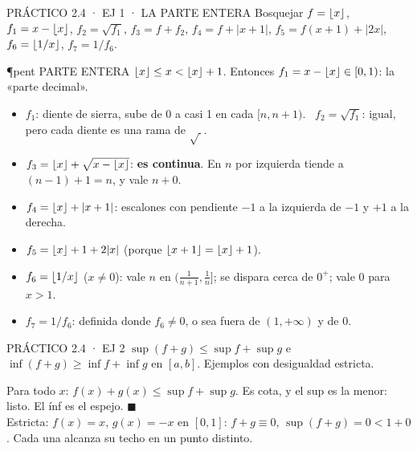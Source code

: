 \begin{enunciado}{PRÁCTICO 2.4 · EJ 1 · LA PARTE ENTERA}
Bosquejar $f=\lfloor x\rfloor$, $f_1=x-\lfloor x\rfloor$, $f_2=\sqrt{f_1}$, $f_3=f+f_2$, $f_4=f+|x+1|$, $f_5=f(x+1)+|2x|$, $f_6=\lfloor 1/x\rfloor$, $f_7=1/f_6$.
\end{enunciado}
\begin{uso}{\P{pent} PARTE ENTERA}
$\lfloor x\rfloor\le x<\lfloor x\rfloor+1$. Entonces $f_1=x-\lfloor x\rfloor\in[0,1)$: la «parte decimal».
\end{uso}
\begin{center}
\end{center}
\begin{itemize}
\item $f_1$: diente de sierra, sube de 0 a casi 1 en cada $[n,n+1)$. \ $f_2=\sqrt{f_1}$: igual, pero cada diente es una rama de $\sqrt{\ }$.
\item $f_3=\lfloor x\rfloor+\sqrt{x-\lfloor x\rfloor}$: \textbf{es continua}. En $n$ por izquierda tiende a $(n-1)+1=n$, y vale $n+0$.
\item $f_4=\lfloor x\rfloor+|x+1|$: escalones con pendiente $-1$ a la izquierda de $-1$ y $+1$ a la derecha.
\item $f_5=\lfloor x\rfloor+1+2|x|$ (porque $\lfloor x+1\rfloor=\lfloor x\rfloor+1$).
\item $f_6=\lfloor 1/x\rfloor$ ($x\neq0$): vale $n$ en $(\frac1{n+1},\frac1n]$; se dispara cerca de $0^+$; vale 0 para $x>1$.
\item $f_7=1/f_6$: definida donde $f_6\neq0$, o sea fuera de $(1,+\infty)$ y de $0$.
\end{itemize}

\begin{enunciado}{PRÁCTICO 2.4 · EJ 2}
$\sup(f+g)\le\sup f+\sup g$ e $\inf(f+g)\ge\inf f+\inf g$ en $[a,b]$. Ejemplos con desigualdad estricta.
\end{enunciado}
Para todo $x$: $f(x)+g(x)\le\sup f+\sup g$. Es cota, y el sup es la menor: listo. El ínf es el espejo. $\blacksquare$\\
Estricta: $f(x)=x$, $g(x)=-x$ en $[0,1]$: $f+g\equiv0$, $\sup(f+g)=0<1+0$. Cada una alcanza su techo en un punto distinto.

